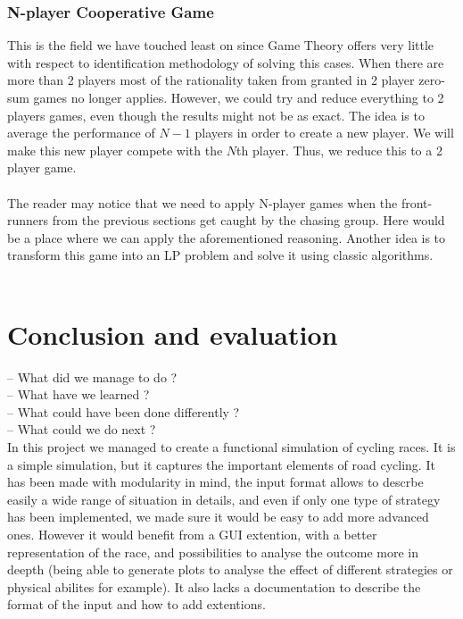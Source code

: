 \documentclass[10pt, a4paper]{report}
\begin{document}
\subsection{N-player Cooperative Game}\label{subsec:nplaycoopgame}
This is the field we have touched least on since Game Theory offers very little with respect to identification methodology of solving this cases. When there are more than 2 players most of the rationality taken from granted in 2 player zero-sum games no longer applies. However, we could try and reduce everything to 2 players games, even though the results might not be as exact. The idea is to average the performance of $N-1$ players in order to create a new player. We will make this new player compete with the $N$th player. Thus, we reduce this to a 2 player game.\\\\
The reader may notice that we need to apply N-player games when the front-runners from the previous sections get caught by the chasing group. Here would be a place where we can apply the aforementioned reasoning. Another idea is to transform this game into an LP problem and solve it using classic algorithms.
\\\\


\chapter{Conclusion and evaluation}\label{ch:concl}

-- What did we manage to do ? \\

-- What have we learned ? \\

-- What could have been done differently ? \\

-- What could we do next ? \\

In this project we managed to create a functional simulation of cycling races. It is a simple simulation, but it captures the important elements of road cycling. It has been made with modularity in mind, the input format allows to descrbe easily a wide range of situation in details, and even if only one type of strategy has been implemented, we made sure it would be easy to add more advanced ones. However it would benefit from a GUI extention, with a better representation of the race, and possibilities to analyse the outcome more in deepth (being able to generate plots to analyse the effect of different strategies or physical abilites for example). It also lacks a documentation to describe the format of the input and how to add extentions. \\
\end{document}
